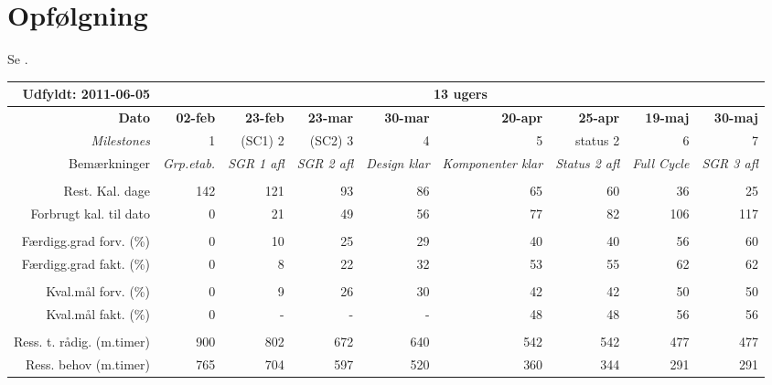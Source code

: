 \section{Opfølgning}
Se .
\begin{sidewaystable}[!htbp]
\begin{footnotesize}
    \begin{tabular}{r|rrrrrrrr}
Udfyldt: 2011-06-05    & \multicolumn{8}{c}{13 ugers} \\ \hline
    \textbf{Dato} & \textbf{02-feb} & \textbf{23-feb} & \textbf{23-mar} & \textbf{30-mar} & \textbf{20-apr} & \textbf{25-apr} & \textbf{19-maj} & \textbf{30-maj} \\
    \textit{Milestones} & 1     & (SC1) 2 & (SC2) 3 & 4     & 5     & status 2 & 6     & 7 \\
    Bemærkninger & \textit{Grp.etab.} & \multicolumn{1}{l}{\textit{SGR 1 afl}} & \multicolumn{1}{l}{\textit{SGR 2 afl}} & \textit{Design klar} & \textit{Komponenter klar} & \textit{Status 2 afl} & \textit{Full Cycle} & \multicolumn{1}{l}{\textit{SGR 3 afl}} \\
          &       &       &       &       &       &       &       & \\
    Rest. Kal. dage & 142   & 121   & 93    & 86    & 65    & 60    & 36    & 25 \\
    Forbrugt kal. til dato & 0     & 21    & 49    & 56    & 77    & 82    & 106    & 117 \\
          &       &       &       &       &       &       &       & \\
    Færdigg.grad forv. (\%) & 0     & 10    & 25    & 29    & 40    & 40    & 56    & 60 \\
    Færdigg.grad fakt. (\%) & 0     & 8     & 22    & 32    & 53    & 55    & 62    & 62 \\
          &       &       &       &       &       &       &       & \\
    Kval.mål forv. (\%) & 0     & 9    & 26    & 30    & 42    & 42    & 50    & 50 \\
    Kval.mål fakt. (\%) & 0     & -   & -   & -   & 48  & 48    & 56    & 56 \\
          &       &       &       &       &       &       &       & \\
    Ress. t. rådig. (m.timer) & 900   & 802   & 672   & 640   & 542   & 542   & 477   & 477 \\
    Ress. behov (m.timer) & 765   & 704 & 597 & 520   & 360   & 344   & 291   & 291 \\

\end{tabular}
\end{footnotesize}
\end{sidewaystable}
